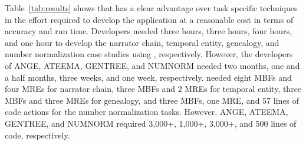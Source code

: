

Table~\ref{tab:results} shows that \framework has a clear advantage over 
task specific techniques in the effort required to develop the application at 
a reasonable cost in terms of accuracy and run time. 
Developers needed three hours, three hours, four hours, and one hour 
to develop the narrator chain, temporal entity, genealogy, and number 
normalization case studies using \framework, respectively. 
However, the developers of ANGE, ATEEMA, GENTREE, and 
NUMNORM needed two months, one and a half months, 
three weeks, and one week, respectively. 
\framework needed eight MBFs and four MREs for narrator chain, 
three MBFs and 2 MREs for temporal entity, three MBFs and three MREs for 
genealogy, and three MBFs, one MRE, and 57 lines of code actions for the number normalization tasks. 
However, ANGE, ATEEMA, GENTREE, and NUMNORM required 
3,000+, 1,000+, 3,000+, and 500 lines of code, respectively.



